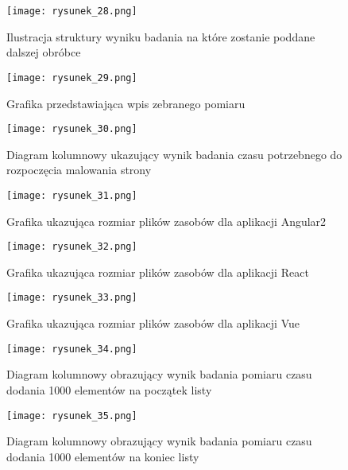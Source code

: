 \begin{figure}[!ht]
    \centering
    \texttt{[image: rysunek\_28.png]}
    \caption{Ilustracja struktury wyniku badania na które zostanie poddane dalszej obróbce}
    \label{fig:rysunek_28}
\end{figure}

\begin{figure}[!ht]
    \centering
    \texttt{[image: rysunek\_29.png]}
    \caption{Grafika przedstawiająca wpis zebranego pomiaru}
    \label{fig:rysunek_29}
\end{figure}

\begin{figure}[!ht]
    \centering
    \texttt{[image: rysunek\_30.png]}
    \caption{Diagram kolumnowy ukazujący wynik badania czasu potrzebnego do rozpoczęcia malowania strony}
    \label{fig:rysunek_30}
\end{figure}

\begin{figure}[!ht]
    \centering
    \texttt{[image: rysunek\_31.png]}
    \caption{Grafika ukazująca rozmiar plików zasobów dla aplikacji Angular2}
    \label{fig:rysunek_31}
\end{figure}

\begin{figure}[!ht]
    \centering
    \texttt{[image: rysunek\_32.png]}
    \caption{Grafika ukazująca rozmiar plików zasobów dla aplikacji React}
    \label{fig:rysunek_32}
\end{figure}

\begin{figure}[!ht]
    \centering
    \texttt{[image: rysunek\_33.png]}
    \caption{Grafika ukazująca rozmiar plików zasobów dla aplikacji Vue}
    \label{fig:rysunek_33}
\end{figure}

\begin{figure}[!ht]
    \centering
    \texttt{[image: rysunek\_34.png]}
    \caption{Diagram kolumnowy obrazujący wynik badania pomiaru czasu dodania 1000 elementów na początek listy}
    \label{fig:rysunek_34}
\end{figure}

\begin{figure}[!ht]
    \centering
    \texttt{[image: rysunek\_35.png]}
    \caption{Diagram kolumnowy obrazujący wynik badania pomiaru czasu dodania 1000 elementów na koniec listy}
    \label{fig:rysunek_35}
\end{figure}

